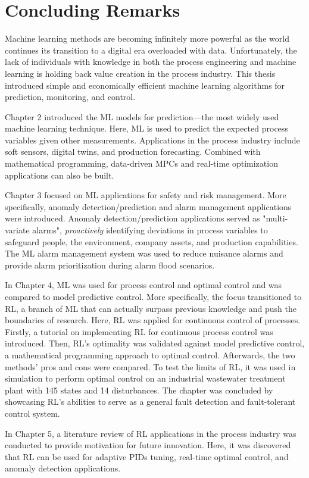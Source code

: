 \section{Concluding Remarks}
Machine learning methods are becoming infinitely more powerful as the world continues its transition to a digital era overloaded with data.  Unfortunately, the lack of individuals with knowledge in both the process engineering and machine learning is holding back value creation in the process industry.  This thesis introduced simple and economically efficient machine learning algorithms for prediction, monitoring, and control.

Chapter 2 introduced the ML models for prediction---the most widely used machine learning technique.  Here, ML is used to predict the expected process variables given other measurements.  Applications in the process industry include soft sensors, digital twins, and production forecasting.  Combined with mathematical programming, data-driven MPCs and real-time optimization applications can also be built.

Chapter 3 focused on ML applications for safety and risk management.  More specifically, anomaly detection/prediction and alarm management applications were introduced.  Anomaly detection/prediction applications served as "multi-variate alarms", \textit{proactively} identifying deviations in process variables to safeguard people, the environment, company assets, and production capabilities.  The ML alarm management system was used to reduce nuisance alarms and provide alarm prioritization during alarm flood scenarios.

In Chapter 4, ML was used for process control and optimal control and was compared to model predictive control. More specifically, the focus transitioned to RL, a branch of ML that can actually surpass previous knowledge and push the boundaries of research. Here, RL was applied for continuous control of processes. Firstly, a tutorial on implementing RL for continuous process control was introduced.  Then, RL's optimality was validated against model predictive control, a mathematical programming approach to optimal control. Afterwards, the two methods' pros and cons were compared.  To test the limits of RL, it was used in simulation to perform optimal control on an industrial wastewater treatment plant with 145 states and 14 disturbances.  The chapter was concluded by showcasing RL's abilities to serve as a general fault detection and fault-tolerant control system.  

In Chapter 5, a literature review of RL applications in the process industry was conducted to provide motivation for future innovation. Here, it was discovered that RL can be used for adaptive PIDs tuning, real-time optimal control, and anomaly detection applications.

